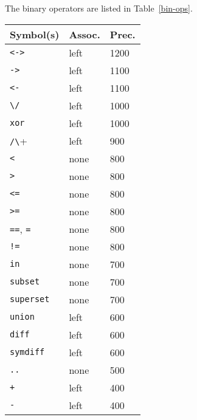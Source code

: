 \documentclass[10pt]{scrartcl}
\begin{document}
The binary operators are listed in Table~\ref{bin-ops}.

\begin{table}[t]
\centering
\begin{tabular}{lll}
\hline
Symbol(s)                       & Assoc.& Prec. \\
\hline
\texttt{<->}                    & left  & 1200  \\

\texttt{->}                     & left  & 1100  \\
\texttt{<-}                     & left  & 1100  \\

\verb+\/+                       & left  & 1000  \\
\texttt{xor}                    & left  & 1000  \\

\verb+/\+                       & left  & 900   \\

\texttt{<}                      & none  & 800   \\
\texttt{>}                      & none  & 800   \\
\texttt{<=}                     & none  & 800   \\
\texttt{>=}                     & none  & 800   \\
\texttt{==},
\texttt{=}                      & none  & 800   \\
\texttt{!=}                     & none  & 800   \\

\texttt{in}                     & none  & 700   \\
\texttt{subset}                 & none  & 700   \\
\texttt{superset}               & none  & 700   \\

\texttt{union}                  & left  & 600   \\
\texttt{diff}                   & left  & 600   \\
\texttt{symdiff}                & left  & 600   \\

\texttt{..}                     & none  & 500   \\

\texttt{+}                      & left  & 400   \\
\texttt{-}                      & left  & 400   \\


\end{tabular}
\end{table}
\end{document}
